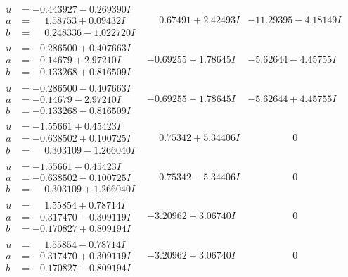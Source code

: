 \documentclass[1p]{elsarticle_modified}
\theoremstyle{definition}
\begin{document}
$$\begin{array}{c|c|c}
\begin{aligned}
u &= -0.443927 - 0.269390 I \\
a &= \phantom{-}1.58753 + 0.09432 I \\
b &= \phantom{-}0.248336 - 1.022720 I\end{aligned}
 & \phantom{-}0.67491 + 2.42493 I & -11.29395 - 4.18149 I \\ \hline\begin{aligned}
u &= -0.286500 + 0.407663 I \\
a &= -0.14679 + 2.97210 I \\
b &= -0.133268 + 0.816509 I\end{aligned}
 & -0.69255 + 1.78645 I & -5.62644 - 4.45755 I \\ \hline\begin{aligned}
u &= -0.286500 - 0.407663 I \\
a &= -0.14679 - 2.97210 I \\
b &= -0.133268 - 0.816509 I\end{aligned}
 & -0.69255 - 1.78645 I & -5.62644 + 4.45755 I \\ \hline\begin{aligned}
u &= -1.55661 + 0.45423 I \\
a &= -0.638502 + 0.100725 I \\
b &= \phantom{-}0.303109 - 1.266040 I\end{aligned}
 & \phantom{-}0.75342 + 5.34406 I & \phantom{-0.000000 } 0 \\ \hline\begin{aligned}
u &= -1.55661 - 0.45423 I \\
a &= -0.638502 - 0.100725 I \\
b &= \phantom{-}0.303109 + 1.266040 I\end{aligned}
 & \phantom{-}0.75342 - 5.34406 I & \phantom{-0.000000 } 0 \\ \hline\begin{aligned}
u &= \phantom{-}1.55854 + 0.78714 I \\
a &= -0.317470 - 0.309119 I \\
b &= -0.170827 + 0.809194 I\end{aligned}
 & -3.20962 + 3.06740 I & \phantom{-0.000000 } 0 \\ \hline\begin{aligned}
u &= \phantom{-}1.55854 - 0.78714 I \\
a &= -0.317470 + 0.309119 I \\
b &= -0.170827 - 0.809194 I\end{aligned}
 & -3.20962 - 3.06740 I & \phantom{-0.000000 } 0 \\ \hline\begin{aligned}

\end{aligned}
\end{array}$$
\end{document}
